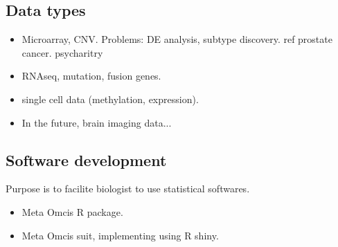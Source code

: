 \documentclass[a4paper, 10pt]{article}
\begin{document}
\subsection{Data types}
\begin{itemize}
\item Microarray, CNV.
Problems: DE analysis, subtype discovery.
ref
prostate cancer.
psycharitry
\item RNAseq, mutation, fusion genes.
\item single cell data (methylation, expression).
\item In the future, brain imaging data...
\end{itemize}

\subsection{Software development}
Purpose is to facilite biologist to use statistical softwares.
\begin{itemize}
\item Meta Omcis R package.
\item Meta Omcis suit, implementing using R shiny.
\end{itemize}
\end{document}
